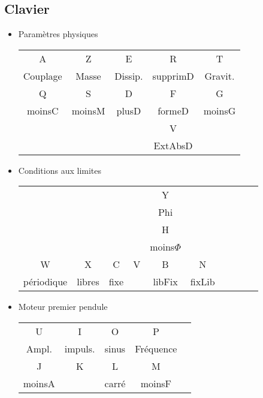 \subsection{Clavier}
%
\footnotesize
\normalsize
\begin{itemize}[leftmargin=2cm, label=, itemsep=0pt]%
\item Paramètres physiques

\begin{tabular}{ccccc}
\sf A &\sf Z &\sf E &\sf R &\sf T  \\
Couplage & Masse & Dissip. & supprimD & Gravit.  \\
\sf Q &\sf S &\sf D &\sf F &\sf G  \\
moinsC & moinsM & plusD & formeD & moinsG  \\
 & & & \sf V   & \\
 & & & ExtAbsD &  \\
\end{tabular}
%
\end{itemize}
\begin{itemize}[leftmargin=2cm, label=, itemsep=0pt]%
\item Conditions aux limites

\hspace{3cm}
\begin{tabular}{cccccccccc}
 & & & &\sf Y \\
 & & & & Phi \\
 & & & &\sf H \\
 & & & & moins$\Phi$  & & &  & \\
\sf W &\sf X &\sf C &\sf V &\sf B &\sf N  \\
périodique & libres & fixe &  & libFix & fixLib  \\
\end{tabular}
%
\end{itemize}
\begin{itemize}[leftmargin=2cm, label=, itemsep=0pt]%
\item Moteur premier pendule

\hspace{9cm}
\begin{tabular}{ccccc}
\sf U &\sf I &\sf O &\sf P \\
 Ampl. & impuls. & sinus & Fréquence \\
\sf J &\sf K &\sf L &\sf M \\
 moinsA &  & carré & moinsF \\
\end{tabular}
%
\end{itemize}

